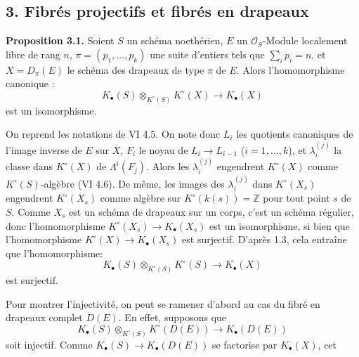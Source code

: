 \subsection*{3. Fibrés projectifs et fibrés en drapeaux}

\textbf{Proposition 3.1.} Soient $S$ un schéma noethérien, $E$ un $\mathcal O_S$-Module localement libre de rang $n$, $\pi=(p_1,\ldots,p_k)$ une suite d'entiers tels que $\sum_i p_i=n$, et $X=D_\pi(E)$ le schéma des drapeaux de type $\pi$ de $E$. Alors l'homomorphisme canonique :
\[
K_\bullet(S)\otimes_{K^\circ(S)}K^\circ(X)\longrightarrow K_\bullet(X)
\]
est un isomorphisme.

On reprend les notations de VI 4.5. On note donc $L_i$ les quotients canoniques de l'image inverse de $E$ sur $X$, $F_i$ le noyau de $L_i\to L_{i-1}$ ($i=1,\ldots,k$), et $\lambda_i^{(j)}$ la classe dans $K^\circ(X)$ de $\Lambda^i(F_j)$. Alors les $\lambda_i^{(j)}$ engendrent $K^\circ(X)$ comme $K^\circ(S)$-algèbre (VI 4.6). De même, les images des $\lambda_i^{(j)}$ dans $K^\circ(X_s)$ engendrent $K^\circ(X_s)$ comme algèbre sur $K^\circ(k(s))=\mathbb Z$ pour tout point $s$ de $S$. Comme $X_s$ est un schéma de drapeaux sur un corps, c'est un schéma régulier, donc l'homomorphisme $K^\circ(X_s)\to K_\bullet(X_s)$ est un isomorphisme, si bien que l'homomorphisme $K^\circ(X)\to K_\bullet(X_s)$ est surjectif. D'après 1.3, cela entraîne que l'homomorphisme:
\[
K_\bullet(S)\otimes_{K^\circ(S)}K^\circ(S)\longrightarrow K_\bullet(X)
\]
est surjectif.

Pour montrer l'injectivité, on peut se ramener d'abord au cas du fibré en drapeaux complet $D(E)$. En effet, supposons que
\[
K_\bullet(S)\otimes_{K^\circ(S)}K^\circ(D(E))\longrightarrow K_\bullet(D(E))
\]
soit injectif. Comme $K_\bullet(S)\to K_\bullet(D(E))$ se factorise par $K_\bullet(X)$, cet
